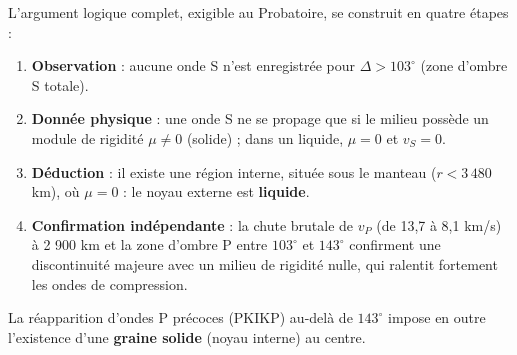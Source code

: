 \documentclass[11pt]{article}
\newcommand{\cle}[1]{{\popxbold\color{popdark}#1}}
\begin{document}
\begin{propriete}
L'argument logique complet, exigible au Probatoire, se construit en quatre étapes :
\begin{enumerate}
\item \textbf{Observation} : aucune onde S n'est enregistrée pour $\Delta > 103^{\circ}$ (zone d'ombre S totale).
\item \textbf{Donnée physique} : une onde S ne se propage que si le milieu possède un module de rigidité $\mu \neq 0$ (solide) ; dans un liquide, $\mu = 0$ et $v_S = 0$.
\item \textbf{Déduction} : il existe une région interne, située sous le manteau ($r < 3\,480$ km), où $\mu = 0$ : le \cle{noyau externe} est \textbf{liquide}.
\item \textbf{Confirmation indépendante} : la chute brutale de $v_P$ (de 13,7 à 8,1 km/s) à 2 900 km et la zone d'ombre P entre $103^{\circ}$ et $143^{\circ}$ confirment une discontinuité majeure avec un milieu de rigidité nulle, qui ralentit fortement les ondes de compression.
\end{enumerate}
La réapparition d'ondes P précoces (PKIKP) au-delà de $143^{\circ}$ impose en outre l'existence d'une \textbf{graine solide} (noyau interne) au centre.
\end{propriete}
\end{document}
